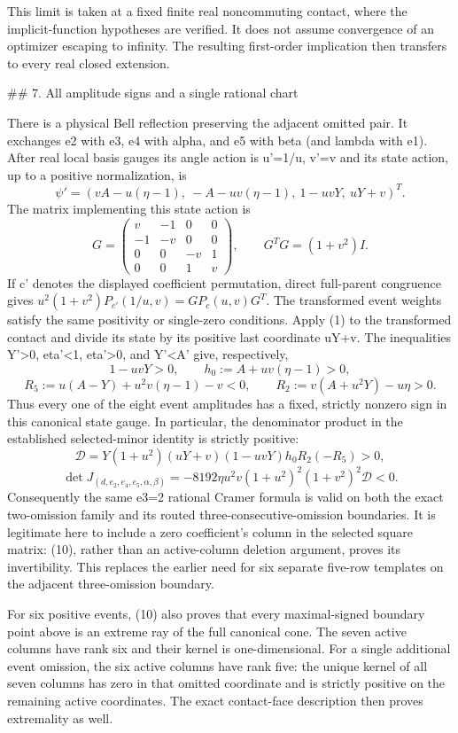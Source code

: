 This limit is taken at a fixed finite real noncommuting contact, where the
implicit-function hypotheses are verified. It does not assume convergence
of an optimizer escaping to infinity. The resulting first-order implication
then transfers to every real closed extension.

## 7. All amplitude signs and a single rational chart

There is a physical Bell reflection preserving the adjacent omitted pair.
It exchanges e2 with e3, e4 with alpha, and e5 with beta (and lambda with
e1). After real local basis gauges its angle action is u'=1/u, v'=v and
its state action, up to a positive normalization, is
\[
\psi'=(vA-u(\eta-1),\ -A-uv(\eta-1),\ 1-uvY,\ uY+v)^T.
\tag{8}
\]
The matrix implementing this state action is
\[
G=\begin{pmatrix}v&-1&0&0\\-1&-v&0&0\\0&0&-v&1\\0&0&1&v\end{pmatrix},
\qquad G^TG=(1+v^2)I.
\]
If c' denotes the displayed coefficient permutation, direct full-parent
congruence gives \(u^2(1+v^2)P_{c'}(1/u,v)=GP_c(u,v)G^T\).
The transformed event weights satisfy the same positivity or single-zero
conditions. Apply (1) to the transformed contact and divide its state by
its positive last coordinate uY+v. The inequalities Y'>0, eta'<1,
eta'>0, and Y'<A' give, respectively,
\[
1-uvY>0,\qquad h_0:=A+uv(\eta-1)>0,
\]
\[
R_5:=u(A-Y)+u^2v(\eta-1)-v<0,
\qquad R_2:=v(A+u^2Y)-u\eta>0.
\tag{9}
\]
Thus every one of the eight event amplitudes has a fixed, strictly nonzero
sign in this canonical state gauge. In particular, the denominator product
in the established selected-minor identity is strictly positive:
\[
\mathcal D=Y(1+u^2)(uY+v)(1-uvY)h_0R_2(-R_5)>0,
\]
\[
\det J_{(d,e_2,e_4,e_5,\alpha,\beta)}
=-8192\eta u^2v(1+u^2)^2(1+v^2)^2\mathcal D<0.
\tag{10}
\]
Consequently the same e3=2 rational Cramer formula is valid on both the
exact two-omission family and its routed three-consecutive-omission
boundaries. It is legitimate here to include a zero coefficient's column
in the selected square matrix: (10), rather than an active-column deletion
argument, proves its invertibility. This replaces the earlier need for six
separate five-row templates on the adjacent three-omission boundary.

For six positive events, (10) also proves that every maximal-signed
boundary point above is an extreme ray of the full canonical cone. The
seven active columns have rank six and their kernel is one-dimensional.
For a single additional event omission, the six active columns have rank
five: the unique kernel of all seven columns has zero in that omitted
coordinate and is strictly positive on the remaining active coordinates.
The exact contact-face description then proves extremality as well.

